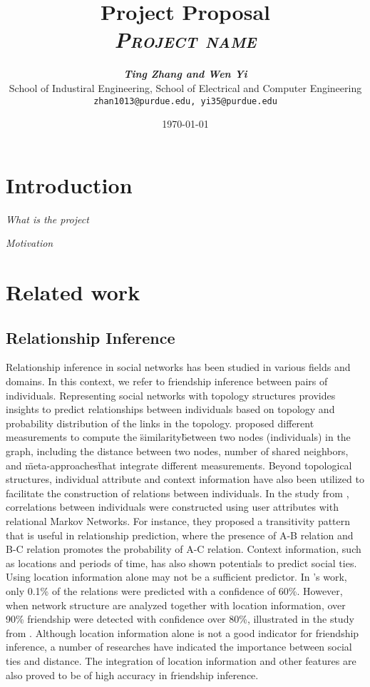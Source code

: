 \documentclass[11pt]{article}
\title{
\textbf{Project Proposal} \\ \textsc{\textit{Project name}} \\
}
\author{
	\textbf{\textit{Ting Zhang and Wen Yi}} \\
	School of Industiral Engineering, School of Electrical and Computer Engineering\\
	\texttt{zhan1013@purdue.edu, yi35@purdue.edu}
}
\date{\today}
\begin{document}
\maketitle


\section{Introduction}
\textit{What is the project}

\textit{Motivation}

\section{Related work}
\subsection{Relationship Inference}
Relationship inference in social networks has been studied in various fields and domains. In this context, we refer to friendship inference between pairs of individuals. Representing social networks with topology structures provides insights to predict relationships  between individuals based on topology and probability distribution of the links in the topology. \cite{liben-nowell_link-prediction_2007} proposed different measurements to compute the \"similarity\" between two nodes (individuals) in the graph, including the distance between two nodes, number of shared neighbors, and \"meta-approaches\" that integrate different measurements. Beyond topological structures, individual attribute and context information have also been utilized to facilitate the construction of relations between individuals. In the study from \cite{liben-nowell_link-prediction_2007}, correlations between individuals were constructed using user attributes with relational Markov Networks. For instance, they proposed a transitivity pattern that is useful in relationship prediction, where the presence of A-B relation and B-C relation promotes the probability of A-C relation. Context information, such as locations and periods of time, has also shown potentials to predict social ties. Using location information alone may not be a sufficient predictor. In \cite{crandall_inferring_2010}'s work, only 0.1\% of the relations were predicted with a confidence of 60\%. However, when network structure are analyzed together with location information, over 90\% friendship were detected with confidence over 80\%, illustrated in the study from \cite{sadilek_finding_2012}. Although location information alone is not a good indicator for friendship inference, a number of researches have indicated the importance between social ties and distance. The integration of location information and other features are also proved to be of high accuracy in friendship inference.
\end{document}
